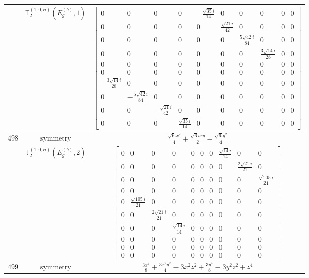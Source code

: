 \documentclass[fleqn,8pt,landscape]{jsarticle}
\begin{document}
\begin{longtable}{ccc}
$  $ & $ \mathbb{T}_{2}^{(1,0;a)}(E_{g}^{(b)},1) $ & $ \begin{bmatrix} 0 & 0 & 0 & 0 & - \frac{\sqrt{35} i}{14} & 0 & 0 & 0 & 0 & 0 \\ 0 & 0 & 0 & 0 & 0 & \frac{\sqrt{21} i}{42} & 0 & 0 & 0 & 0 \\ 0 & 0 & 0 & 0 & 0 & 0 & \frac{5 \sqrt{42} i}{84} & 0 & 0 & 0 \\ 0 & 0 & 0 & 0 & 0 & 0 & 0 & \frac{3 \sqrt{14} i}{28} & 0 & 0 \\ 0 & 0 & 0 & 0 & 0 & 0 & 0 & 0 & 0 & 0 \\ 0 & 0 & 0 & 0 & 0 & 0 & 0 & 0 & 0 & 0 \\ - \frac{3 \sqrt{14} i}{28} & 0 & 0 & 0 & 0 & 0 & 0 & 0 & 0 & 0 \\ 0 & - \frac{5 \sqrt{42} i}{84} & 0 & 0 & 0 & 0 & 0 & 0 & 0 & 0 \\ 0 & 0 & - \frac{\sqrt{21} i}{42} & 0 & 0 & 0 & 0 & 0 & 0 & 0 \\ 0 & 0 & 0 & \frac{\sqrt{35} i}{14} & 0 & 0 & 0 & 0 & 0 & 0 \end{bmatrix} $ \\ \hline
$ 498 $ & $ \text{symmetry} $ & $ \frac{\sqrt{6} x^{2}}{4} + \frac{\sqrt{6} i x y}{2} - \frac{\sqrt{6} y^{2}}{4} $ \\
$  $ & $ \mathbb{T}_{2}^{(1,0;a)}(E_{g}^{(b)},2) $ & $ \begin{bmatrix} 0 & 0 & 0 & 0 & 0 & 0 & 0 & \frac{\sqrt{14} i}{14} & 0 & 0 \\ 0 & 0 & 0 & 0 & 0 & 0 & 0 & 0 & \frac{2 \sqrt{21} i}{21} & 0 \\ 0 & 0 & 0 & 0 & 0 & 0 & 0 & 0 & 0 & \frac{\sqrt{105} i}{21} \\ 0 & 0 & 0 & 0 & 0 & 0 & 0 & 0 & 0 & 0 \\ 0 & \frac{\sqrt{105} i}{21} & 0 & 0 & 0 & 0 & 0 & 0 & 0 & 0 \\ 0 & 0 & \frac{2 \sqrt{21} i}{21} & 0 & 0 & 0 & 0 & 0 & 0 & 0 \\ 0 & 0 & 0 & \frac{\sqrt{14} i}{14} & 0 & 0 & 0 & 0 & 0 & 0 \\ 0 & 0 & 0 & 0 & 0 & 0 & 0 & 0 & 0 & 0 \\ 0 & 0 & 0 & 0 & 0 & 0 & 0 & 0 & 0 & 0 \\ 0 & 0 & 0 & 0 & 0 & 0 & 0 & 0 & 0 & 0 \end{bmatrix} $ \\ \hline
$ 499 $ & $ \text{symmetry} $ & $ \frac{3 x^{4}}{8} + \frac{3 x^{2} y^{2}}{4} - 3 x^{2} z^{2} + \frac{3 y^{4}}{8} - 3 y^{2} z^{2} + z^{4} $ \\

\end{longtable}
\end{document}
